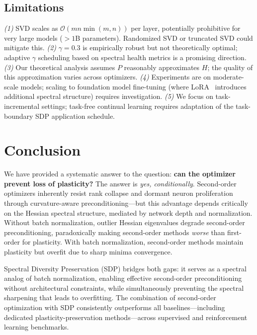 \documentclass{article}
\newcommand{\cO}{\mathcal{O}}
\begin{document}
\subsection{Limitations}

\emph{(1)} SVD scales as $\cO(mn\min(m,n))$ per layer, potentially prohibitive for very large models ($>1$B parameters). Randomized SVD or truncated SVD could mitigate this.
\emph{(2)} $\gamma = 0.3$ is empirically robust but not theoretically optimal; adaptive $\gamma$ scheduling based on spectral health metrics is a promising direction.
\emph{(3)} Our theoretical analysis assumes $P$ reasonably approximates $H$; the quality of this approximation varies across optimizers.
\emph{(4)} Experiments are on moderate-scale models; scaling to foundation model fine-tuning (where LoRA~\citep{xu2026subspace} introduces additional spectral structure) requires investigation.
\emph{(5)} We focus on task-incremental settings; task-free continual learning requires adaptation of the task-boundary SDP application schedule.

\section{Conclusion}
\label{sec:conclusion}

We have provided a systematic answer to the question: \textbf{can the optimizer prevent loss of plasticity?} The answer is \emph{yes, conditionally}. Second-order optimizers inherently resist rank collapse and dormant neuron proliferation through curvature-aware preconditioning---but this advantage depends critically on the Hessian spectral structure, mediated by network depth and normalization. Without batch normalization, outlier Hessian eigenvalues degrade second-order preconditioning, paradoxically making second-order methods \emph{worse} than first-order for plasticity. With batch normalization, second-order methods maintain plasticity but overfit due to sharp minima convergence.

Spectral Diversity Preservation (SDP) bridges both gaps: it serves as a spectral analog of batch normalization, enabling effective second-order preconditioning without architectural constraints, while simultaneously preventing the spectral sharpening that leads to overfitting. The combination of second-order optimization with SDP consistently outperforms all baselines---including dedicated plasticity-preservation methods---across supervised and reinforcement learning benchmarks.
\end{document}
